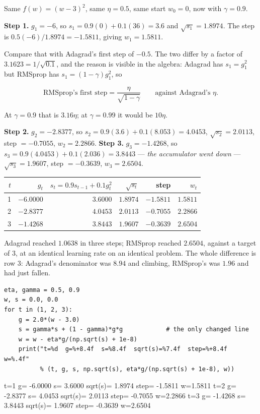 \documentclass[11pt]{article}
\begin{document}
\begin{worked}
Same $f(w) = (w-3)^2$, same $\eta = 0.5$, same start $w_0 = 0$, now with
$\gamma = 0.9$.

\textbf{Step 1.} $g_1 = -6$, so $s_1 = 0.9(0) + 0.1(36) = 3.6$ and
$\sqrt{s_1} = 1.8974$. The step is $0.5(-6)/1.8974 = -1.5811$, giving
$w_1 = 1.5811$.

Compare that with Adagrad's first step of $-0.5$. The two differ by a factor of
$3.1623 = 1/\sqrt{0.1}$, and the reason is visible in the algebra: Adagrad has
$s_1 = g_1^2$ but RMSprop has $s_1 = (1-\gamma)g_1^2$, so

\begin{equation}
  \label{eq:rmsfirst}
  \text{RMSprop's first step} = \frac{\eta}{\sqrt{1-\gamma}}
  \qquad\text{against Adagrad's } \eta .
\end{equation}

At $\gamma = 0.9$ that is $3.16\eta$; at $\gamma = 0.99$ it would be $10\eta$.

\textbf{Step 2.} $g_2 = -2.8377$, so $s_2 = 0.9(3.6) + 0.1(8.053) = 4.0453$,
$\sqrt{s_2} = 2.0113$, step $=-0.7055$, $w_2 = 2.2866$. \textbf{Step 3.}
$g_3 = -1.4268$, so $s_3 = 0.9(4.0453) + 0.1(2.036) = 3.8443$ --- \emph{the
accumulator went down} --- $\sqrt{s_3} = 1.9607$, step $=-0.3639$,
$w_3 = 2.6504$.

\begin{center}
\begin{tabular}{@{}rrrrrr@{}}
\toprule
$t$ & $g_t$ & $s_t = 0.9 s_{t-1} + 0.1 g_t^2$ & $\sqrt{s_t}$ & step & $w_t$\\
\midrule
1 & $-6.0000$ & $3.6000$ & $1.8974$ & $-1.5811$ & $1.5811$\\
2 & $-2.8377$ & $4.0453$ & $2.0113$ & $-0.7055$ & $2.2866$\\
3 & $-1.4268$ & $3.8443$ & $1.9607$ & $-0.3639$ & $2.6504$\\
\bottomrule
\end{tabular}
\end{center}

Adagrad reached $1.0638$ in three steps; RMSprop reached $2.6504$, against a
target of $3$, at an identical learning rate on an identical problem. The whole
difference is row 3: Adagrad's denominator was $8.94$ and climbing, RMSprop's
was $1.96$ and had just fallen.
\end{worked}

\begin{lstlisting}
eta, gamma = 0.5, 0.9
w, s = 0.0, 0.0
for t in (1, 2, 3):
    g = 2.0*(w - 3.0)
    s = gamma*s + (1 - gamma)*g*g            # the only changed line
    w = w - eta*g/(np.sqrt(s) + 1e-8)
    print("t=%d  g=%+8.4f  s=%8.4f  sqrt(s)=%7.4f  step=%+8.4f  w=%.4f"
          % (t, g, s, np.sqrt(s), eta*g/(np.sqrt(s) + 1e-8), w))
\end{lstlisting}
\begin{codeout}
t=1  g= -6.0000  s=  3.6000  sqrt(s)= 1.8974  step= -1.5811  w=1.5811
t=2  g= -2.8377  s=  4.0453  sqrt(s)= 2.0113  step= -0.7055  w=2.2866
t=3  g= -1.4268  s=  3.8443  sqrt(s)= 1.9607  step= -0.3639  w=2.6504
\end{codeout}
\end{document}

